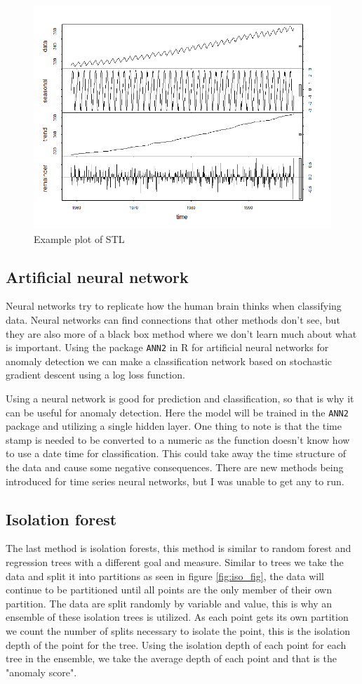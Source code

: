 \documentclass{article}
\begin{document}
\begin{figure}[ht]
    \centering
    \includegraphics[width=.7\textwidth]{stl_model.png}
    \caption{Example plot of STL}
    \label{fig:stl_fig}
\end{figure}

\subsection{Artificial neural network}
Neural networks try to replicate how the human brain thinks when classifying data. Neural networks can find connections that other methods don't see, but they are also more of a black box method where we don't learn much about what is important. Using the package \texttt{ANN2} in R for artificial neural networks for anomaly detection we can make a classification network based on stochastic gradient descent using a log loss function.

Using a neural network is good for prediction and classification, so that is why it can be useful for anomaly detection. Here the model will be trained in the \texttt{ANN2} package and utilizing a single hidden layer. One thing to note is that the time stamp is needed to be converted to a numeric as the function doesn't know how to use a date time for classification. This could take away the time structure of the data and cause some negative consequences. There are new methods being introduced for time series neural networks, but I was unable to get any to run.

\subsection{Isolation forest}
The last method is isolation forests, this method is similar to random forest and regression trees with a different goal and measure. Similar to trees we take the data and split it into partitions as seen in figure \ref{fig:iso_fig}, the data will continue to be partitioned until all points are the only member of their own partition. The data are split randomly by variable and value, this is why an ensemble of these isolation trees is utilized. As each point gets its own partition we count the number of splits necessary to isolate the point, this is the isolation depth of the point for the tree. Using the isolation depth of each point for each tree in the ensemble, we take the average depth of each point and that is the "anomaly score".
\end{document}
